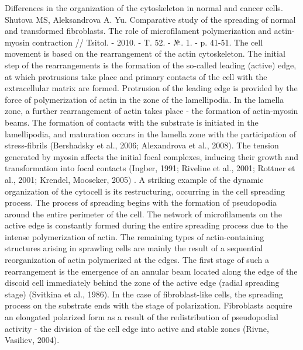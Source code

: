 \documentclass[english,authoryear]{elsarticle}
\begin{document}
Differences in the organization of the cytoskeleton in normal and cancer cells. Shutova MS, Aleksandrova A. Yu. Comparative study of the spreading of normal and transformed fibroblasts. The role of microfilament polymerization and actin-myosin contraction // Tsitol. - 2010. - T. 52. - №. 1. - p. 41-51.
The cell movement is based on the rearrangement of the actin cytoskeleton. The initial step of the rearrangements is the formation of the so-called leading (active) edge, at which protrusions take place and primary contacts of the cell with the extracellular matrix are formed. Protrusion of the leading edge is provided by the force of polymerization of actin in the zone of the lamellipodia. In the lamella zone, a further rearrangement of actin takes place - the formation of actin-myosin beams. The formation of contacts with the substrate is initiated in the lamellipodia, and maturation occurs in the lamella zone with the participation of stress-fibrils (Bershadsky et al., 2006; Alexandrova et al., 2008). The tension generated by myosin affects the initial focal complexes, inducing their growth and transformation into focal contacts (Ingber, 1991; Riveline et al., 2001; Rottner et al., 2001; Krendel, Mooseker, 2005) .
A striking example of the dynamic organization of the cytocell is its restructuring, occurring in the cell spreading process. The process of spreading begins with the formation of pseudopodia around the entire perimeter of the cell. The network of microfilaments on the active edge is constantly formed during the entire spreading process due to the intense polymerization of actin. The remaining types of actin-containing structures arising in sprawling cells are mainly the result of a sequential reorganization of actin polymerized at the edges. The first stage of such a rearrangement is the emergence of an annular beam located along the edge of the discoid cell immediately behind the zone of the active edge (radial spreading stage) (Svitkina et al., 1986). In the case of fibroblast-like cells, the spreading process on the substrate ends with the stage of polarization. Fibroblasts acquire an elongated polarized form as a result of the redistribution of pseudopodial activity - the division of the cell edge into active and stable zones (Rivne, Vasiliev, 2004).
\end{document}
